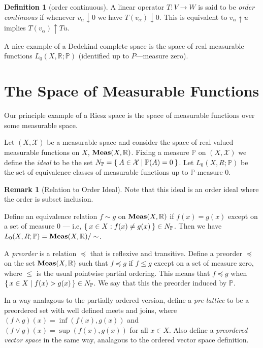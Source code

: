 \documentclass[letterpaper,10pt,oneside,onecolumn,reqno]{amsart}
\renewcommand{\P}{\mathbb P}
\newcommand{\R}{\mathbb R}
\newcommand{\X}{\mathcal X}
\theoremstyle{definition}
\newtheorem{defn}{Definition}
\newtheorem{rem}{Remark}
\newcommand{\catname}[1]{{\normalfont\textbf{#1}}}
\newcommand{\Meas}{\catname{Meas}}
\newcommand{\meet}{\wedge}
\newcommand{\join}{\vee}
\begin{document}
\begin{defn}[order continuous]\label{def:13}
  A linear operator $T : V \to W$ is said to be \emph{order continuous} if whenever $v_{\alpha} \downarrow
  0$ we have $T(v_{\alpha}) \downarrow 0$. This is equivalent to
  $v_{\alpha} \uparrow u$ implies $T(v_{\alpha}) \uparrow Tu$.
\end{defn}


A nice example of a Dedekind complete space is the space of real
measurable functions $L_0(X,\R;\P)$ (identified up to $P$---measure
zero).

\part{The Space of Measurable Functions}

Our principle example of a Riesz space is the space of measurable
functions over some measurable space.

Let $(X, \X)$ be a measurable space and consider the space of real
valued measurable functions on $X$, $\Meas(X,\R)$. Fixing a measure
$\P$ on $(X, \X)$ we define the \emph{ideal} to be the
set $N_\P = \Set{A \in \X | \P(A) = 0}$. Let $L_0(X,R;\P)$ be the set
of equivalence classes of measurable functions up to $\P$-measure 0.

\begin{rem}[Relation to Order Ideal]\label{rem:4}
  Note that this ideal is an order ideal where the order is subset
  inclusion.
\end{rem}

Define an equivalence relation $f \sim g$ on $\Meas(X, \R)$ if $f(x) =
g(x)$ except on a set of measure 0 --- i.e, $\Set{x \in X : f(x) \neq
  g(x)} \in N_\P$. Then we have $L_0(X,R;\P) = \Meas(X,\R) / \sim$.

A \emph{preorder} is a relation $\preceq $ that is
reflexive and transitive. Define a preorder $\preceq $ on the set
$\Meas(X,\R)$ such that $f \preceq g$ if $f \leq g$ except on a set of
measure zero, where $\leq $ is the usual pointwise partial
ordering. This means that $f \preceq g$ when $\set{x \in X | f(x) >
  g(x)} \in N_\P$. We say that this the preorder induced by $\P$.

In a way analagous to the partially ordered version, define a
\emph{pre-lattice} to be a preordered set with well
defined meets and joins, where $(f \meet g)(x) = \inf(f(x),g(x))$ and
$(f \join g)(x) = \sup(f(x),g(x))$ for all $x \in X$. Also define a
\emph{preordered vector space} in the
same way, analagous to the ordered vector space definition.
\end{document}
